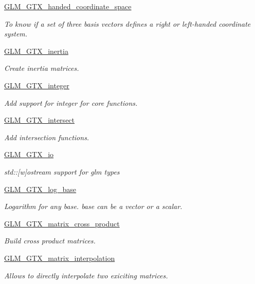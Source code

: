 \begin{DoxyCompactItemize}
\hyperlink{group__gtx__handed__coordinate__space}{G\+L\+M\+\_\+\+G\+T\+X\+\_\+handed\+\_\+coordinate\+\_\+space}
\begin{DoxyCompactList}\small\item\em To know if a set of three basis vectors defines a right or left-\/handed coordinate system. \end{DoxyCompactList}\item 
\hyperlink{group__gtx__inertia}{G\+L\+M\+\_\+\+G\+T\+X\+\_\+inertia}
\begin{DoxyCompactList}\small\item\em Create inertia matrices. \end{DoxyCompactList}\item 
\hyperlink{group__gtx__integer}{G\+L\+M\+\_\+\+G\+T\+X\+\_\+integer}
\begin{DoxyCompactList}\small\item\em Add support for integer for core functions. \end{DoxyCompactList}\item 
\hyperlink{group__gtx__intersect}{G\+L\+M\+\_\+\+G\+T\+X\+\_\+intersect}
\begin{DoxyCompactList}\small\item\em Add intersection functions. \end{DoxyCompactList}\item 
\hyperlink{group__gtx__io}{G\+L\+M\+\_\+\+G\+T\+X\+\_\+io}
\begin{DoxyCompactList}\small\item\em std\+:\+:\mbox{[}w\mbox{]}ostream support for glm types \end{DoxyCompactList}\item 
\hyperlink{group__gtx__log__base}{G\+L\+M\+\_\+\+G\+T\+X\+\_\+log\+\_\+base}
\begin{DoxyCompactList}\small\item\em Logarithm for any base. base can be a vector or a scalar. \end{DoxyCompactList}\item 
\hyperlink{group__gtx__matrix__cross__product}{G\+L\+M\+\_\+\+G\+T\+X\+\_\+matrix\+\_\+cross\+\_\+product}
\begin{DoxyCompactList}\small\item\em Build cross product matrices. \end{DoxyCompactList}\item 
\hyperlink{group__gtx__matrix__interpolation}{G\+L\+M\+\_\+\+G\+T\+X\+\_\+matrix\+\_\+interpolation}
\begin{DoxyCompactList}\small\item\em Allows to directly interpolate two exiciting matrices. \end{DoxyCompactList}\item 

\end{DoxyCompactItemize}
